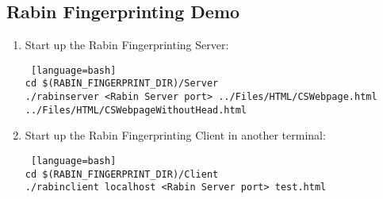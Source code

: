 \subsection{Rabin Fingerprinting Demo}

\begin{enumerate}

\item 

Start up the Rabin Fingerprinting Server:

\begin{lstlisting} [language=bash] 
cd $(RABIN_FINGERPRINT_DIR)/Server
./rabinserver <Rabin Server port> ../Files/HTML/CSWebpage.html ../Files/HTML/CSWebpageWithoutHead.html
\end{lstlisting}

\item Start up the Rabin Fingerprinting Client in another terminal:

\begin{lstlisting} [language=bash] 
cd $(RABIN_FINGERPRINT_DIR)/Client
./rabinclient localhost <Rabin Server port> test.html
\end{lstlisting}

\end{enumerate}

